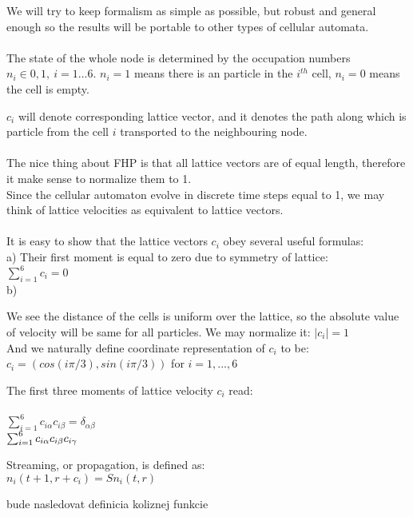 We will try to keep formalism as simple as possible, but robust and general enough so the results will be portable to other types of cellular automata.\\
\\

The state of the whole node is determined by the occupation numbers $n_i\in {0,1},~i=1...6$. $n_i=1$ means there is an particle in the $i^{th}$ cell, $n_i = 0$ means the cell is empty. 

$c_i$ will denote corresponding lattice vector, and it denotes the path along which is particle from the cell $i$ transported to the neighbouring node.\\
\\
The nice thing about FHP is that all lattice vectors are of equal length, therefore it make sense to normalize them to 1.\\
Since the cellular automaton evolve in discrete time steps equal to 1,
we may think of lattice velocities as equivalent to lattice vectors.\\
\\
It is easy to show that the lattice vectors $c_i$ obey several useful formulas:\\
a) Their first moment is equal to zero due to symmetry of lattice:\\
$\sum_{i=1}^{6} c_i = 0$  \\
b) 




We see the distance of the cells is uniform over the lattice, 
so the absolute value of velocity will be same for all particles.
We may normalize it: $\mid{c_i}\mid = 1$ \\

And we naturally define coordinate representation of $c_i$ to be:\\

$ c_i = (cos(i\pi/3) , sin(i\pi/3))$ for $i = 1,...,6 $

The first three moments of lattice velocity $c_i$ read: \\ 
\\

$\sum_{i=1}^{6} c_{i\alpha}c_{i\beta} = \delta_{\alpha\beta}$ \\
$\sum_{i=1}^{6} c_{i\alpha}c_{i\beta}c_{i\gamma} \\ $

Streaming, or propagation, is defined as:\\
$ n_i(t + 1, r + c_i) = \textit{S}n_i(t, r) $

bude nasledovat definicia koliznej funkcie 